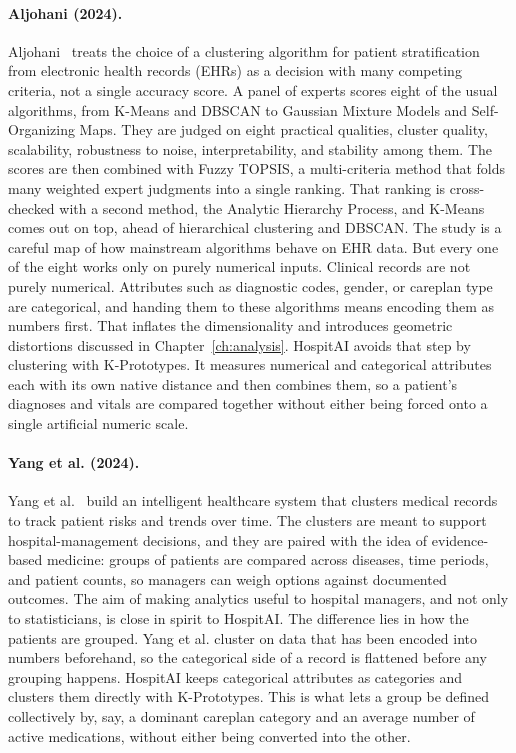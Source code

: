 \paragraph{Aljohani (2024).}
Aljohani~\cite{aljohani2024} treats the choice of a clustering algorithm for patient stratification from electronic health records (EHRs) as a decision with many competing criteria, not a single accuracy score.
A panel of experts scores eight of the usual algorithms, from K-Means and DBSCAN to Gaussian Mixture Models and Self-Organizing Maps.
They are judged on eight practical qualities, cluster quality, scalability, robustness to noise, interpretability, and stability among them.
The scores are then combined with Fuzzy TOPSIS, a multi-criteria method that folds many weighted expert judgments into a single ranking.
That ranking is cross-checked with a second method, the Analytic Hierarchy Process, and K-Means comes out on top, ahead of hierarchical clustering and DBSCAN.
The study is a careful map of how mainstream algorithms behave on EHR data. But every one of the eight works only on purely numerical inputs.
Clinical records are not purely numerical. Attributes such as diagnostic codes, gender, or careplan type are categorical, and handing them to these algorithms means encoding them as numbers first. That inflates the dimensionality and introduces geometric distortions discussed in Chapter~\ref{ch:analysis}.
HospitAI avoids that step by clustering with K-Prototypes. It measures numerical and categorical attributes each with its own native distance and then combines them, so a patient's diagnoses and vitals are compared together without either being forced onto a single artificial numeric scale.

\paragraph{Yang et al. (2024).}
Yang et al.~\cite{yang2024} build an intelligent healthcare system that clusters medical records to track patient risks and trends over time.
The clusters are meant to support hospital-management decisions, and they are paired with the idea of evidence-based medicine: groups of patients are compared across diseases, time periods, and patient counts, so managers can weigh options against documented outcomes.
The aim of making analytics useful to hospital managers, and not only to statisticians, is close in spirit to HospitAI.
The difference lies in how the patients are grouped.
Yang et al. cluster on data that has been encoded into numbers beforehand, so the categorical side of a record is flattened before any grouping happens.
HospitAI keeps categorical attributes as categories and clusters them directly with K-Prototypes.
This is what lets a group be defined collectively by, say, a dominant careplan category and an average number of active medications, without either being converted into the other.

